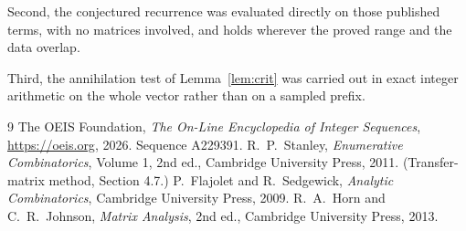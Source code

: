 \documentclass[11pt,a4paper]{article}
\theoremstyle{plain}
\theoremstyle{definition}
\begin{document}
Second, the conjectured recurrence was evaluated directly on those published terms, with no
matrices involved, and holds wherever the proved range and the data overlap.

Third, the annihilation test of Lemma~\ref{lem:crit} was carried out in exact integer
arithmetic on the whole vector rather than on a sampled prefix.

\begin{thebibliography}{9}
 The OEIS Foundation, \emph{The On-Line Encyclopedia of Integer
Sequences}, \url{https://oeis.org}, 2026. Sequence A229391.
 R.~P.~Stanley, \emph{Enumerative Combinatorics}, Volume 1, 2nd ed.,
Cambridge University Press, 2011. (Transfer-matrix method, Section 4.7.)
 P.~Flajolet and R.~Sedgewick, \emph{Analytic Combinatorics}, Cambridge
University Press, 2009.
 R.~A.~Horn and C.~R.~Johnson, \emph{Matrix Analysis}, 2nd ed., Cambridge
University Press, 2013.
\end{thebibliography}
\end{document}

